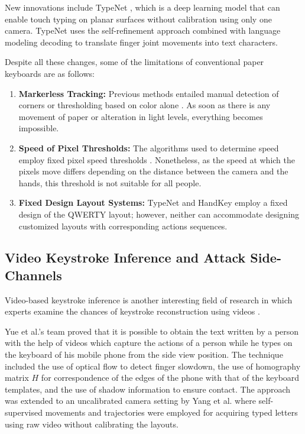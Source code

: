 New innovations include TypeNet \cite{Maman2023TypeNet}, which is a deep learning model that can enable touch typing on planar surfaces without calibration using only one camera. TypeNet uses the self-refinement approach combined with language modeling decoding to translate finger joint movements into text characters.

Despite all these changes, some of the limitations of conventional paper keyboards are as follows:
\begin{enumerate}
    \item \textbf{Markerless Tracking:} Previous methods entailed manual detection of corners or thresholding based on color alone \cite{Zhang2001Visual, Khare2019QWERTY}. As soon as there is any movement of paper or alteration in light levels, everything becomes impossible.
    \item \textbf{Speed of Pixel Thresholds:} The algorithms used to determine speed employ fixed pixel speed thresholds \cite{Srivastava2012RealTime}. Nonetheless, as the speed at which the pixels move differs depending on the distance between the camera and the hands, this threshold is not suitable for all people.
    \item \textbf{Fixed Design Layout Systems:} TypeNet \cite{Maman2023TypeNet} and HandKey \cite{Enkhbat2020HandKey} employ a fixed design of the QWERTY layout; however, neither can accommodate designing customized layouts with corresponding actions sequences.
\end{enumerate}

\subsection{Video Keystroke Inference and Attack Side-Channels}
\label{subsec:lit_attack_systems}
Video-based keystroke inference is another interesting field of research in which experts examine the chances of keystroke reconstruction using videos \cite{Yue2014Blind, Yang2022Towards}.

Yue et al.'s \cite{Yue2014Blind} team proved that it is possible to obtain the text written by a person with the help of videos which capture the actions of a person while he types on the keyboard of his mobile phone from the side view position. The technique included the use of optical flow to detect finger slowdown, the use of homography matrix $H$ for correspondence of the edges of the phone with that of the keyboard templates, and the use of shadow information to ensure contact. The approach was extended to an uncalibrated camera setting by Yang et al. \cite{Yang2022Towards} where self-supervised movements and trajectories were employed for acquiring typed letters using raw video without calibrating the layouts.

